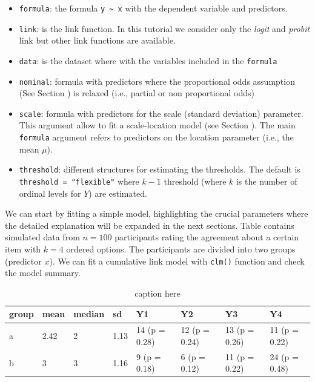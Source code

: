 \documentclass[
  man,floatsintext]{apa6}
\providecommand{\tightlist}{%
  \setlength{\itemsep}{0pt}\setlength{\parskip}{0pt}}
\begin{document}
\begin{itemize}
\tightlist
\item
  \texttt{formula}: the formula \texttt{y\ \textasciitilde{}\ x} with the dependent variable and predictors.
\item
  \texttt{link}: is the link function. In this tutorial we consider only the \emph{logit} and \emph{probit} link but other link functions are available.
\item
  \texttt{data}: is the dataset where with the variables included in the \texttt{formula}
\item
  \texttt{nominal}: formula with predictors where the proportional odds assumption (See Section ) is relaxed (i.e., partial or non proportional odds)
\item
  \texttt{scale}: formula with predictors for the scale (standard deviation) parameter. This argument allow to fit a scale-location model (see Section ). The main \texttt{formula} argument refers to predictors on the location parameter (i.e., the mean \(\mu\)).
\item
  \texttt{threshold}: different structures for estimating the thresholds. The default is \texttt{threshold\ =\ "flexible"} where \(k - 1\) threshold (where \(k\) is the number of ordinal levels for \(Y\)) are estimated.
\end{itemize}

We can start by fitting a simple model, highlighting the crucial parameters where the detailed explanation will be expanded in the next sections. Table contains simulated data from \(n = 100\) participants rating the agreement about a certain item with \(k = 4\) ordered options. The participants are divided into two groups (predictor \(x\)). We can fit a cumulative link model with \texttt{clm()} function and check the model summary.

\scriptsize

\begin{table}

\caption{\label{tab:tab-dataset-example}caption here}
\centering
\begin{tabular}[t]{llllllll}
\toprule
group & mean & median & sd & Y1 & Y2 & Y3 & Y4\\
\midrule
a & 2.42 & 2 & 1.13 & 14 (p = 0.28) & 12 (p = 0.24) & 13 (p = 0.26) & 11 (p = 0.22)\\
b & 3 & 3 & 1.16 & 9 (p = 0.18) & 6 (p = 0.12) & 11 (p = 0.22) & 24 (p = 0.48)\\
\bottomrule
\end{tabular}
\end{table}
\end{document}
